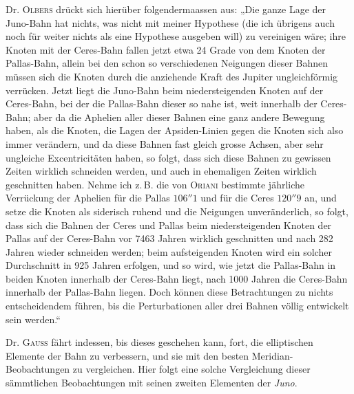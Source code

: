 Dr. \textsc{Olbers} drückt sich hierüber folgendermaassen aus: „Die ganze Lage der Juno-Bahn hat nichts,
was nicht mit meiner Hypothese (die ich übrigens auch noch für weiter nichts als eine Hypothese ausgeben will) zu vereinigen wäre; ihre Knoten mit der Ceres-Bahn fallen jetzt etwa 24 Grade von dem
Knoten der Pallas-Bahn, allein bei den schon so verschiedenen Neigungen dieser Bahnen müssen sich
die Knoten durch die anziehende Kraft des Jupiter ungleichförmig verrücken. Jetzt liegt die Juno-Bahn beim niedersteigenden Knoten auf der Ceres-Bahn, bei der die Pallas-Bahn dieser so nahe ist,
weit innerhalb der Ceres-Bahn; aber da die Aphelien aller dieser Bahnen eine ganz andere Bewegung
haben, als die Knoten, die Lagen der Apsiden-Linien gegen die Knoten sich also immer verändern, und
da diese Bahnen fast gleich grosse Achsen, aber sehr ungleiche Excentricitäten haben, so folgt, dass
sich diese Bahnen zu gewissen Zeiten wirklich schneiden werden, und auch in ehemaligen Zeiten wirklich geschnitten haben. Nehme ich z.\,B. die von \textsc{Oriani} bestimmte jährliche Verrückung der Aphelien
für die Pallas $106''1$ und für die Ceres $120''9$ an, und setze die Knoten als siderisch ruhend und die
Neigungen unveränderlich, so folgt, dass sich die Bahnen der Ceres und Pallas beim niedersteigenden
Knoten der Pallas auf der Ceres-Bahn vor 7463 Jahren wirklich geschnitten und nach 282 Jahren wieder
schneiden werden; beim aufsteigenden Knoten wird ein solcher Durchschnitt in 925 Jahren erfolgen, und
so wird, wie jetzt die Pallas-Bahn in beiden Knoten innerhalb der Ceres-Bahn liegt, nach 1000 Jahren
die Ceres-Bahn innerhalb der Pallas-Bahn liegen. Doch können diese Betrachtungen zu nichts entscheidendem führen, bis die Perturbationen aller drei Bahnen völlig entwickelt sein werden.“

Dr. \textsc{Gauss} fährt indessen, bis dieses geschehen kann, fort, die elliptischen Elemente der Bahn
zu verbessern, und sie mit den besten Meridian-Beobachtungen zu vergleichen. Hier folgt eine solche
Vergleichung dieser sämmtlichen Beobachtungen mit seinen zweiten Elementen der \emph{Juno}.

